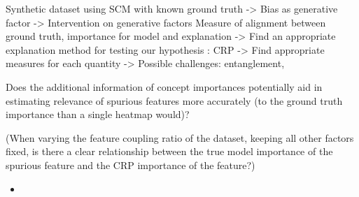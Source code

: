 Synthetic dataset using SCM with known ground truth
-> Bias as generative factor
-> Intervention on generative factors
Measure of alignment between ground truth, importance for model and explanation
-> Find an appropriate explanation method for testing our hypothesis : CRP
-> Find appropriate measures for each quantity
-> Possible challenges: entanglement,



Does the additional information of concept importances potentially aid in estimating
relevance of spurious features  more accurately (to the ground truth importance than a single heatmap would)?


(When varying the feature coupling ratio of the dataset, keeping all other factors fixed, is there a clear relationship between the true model importance of the spurious feature and the CRP importance of the feature?)


\begin{itemize}
    \item
\end{itemize}